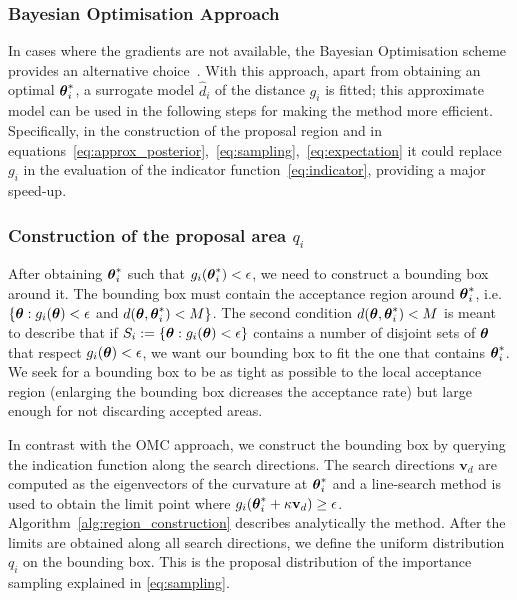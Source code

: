 \subsubsection*{Bayesian Optimisation Approach}
\label{subsubsec:GP_approach}

In cases where the gradients are not available, the Bayesian
Optimisation scheme provides an alternative
choice~\autocite{Shahriari2016}. With this approach, apart from
obtaining an optimal $\boldsymbol{\theta}_i^* $, a surrogate model $\hat{d}_i$ of
the distance $g_i$ is fitted; this approximate model can be used in
the following steps for making the method more
efficient. Specifically, in the construction of the proposal region
and in
equations~\eqref{eq:approx_posterior},~\eqref{eq:sampling},~\eqref{eq:expectation}
it could replace $g_i$ in the evaluation of the indicator
function~\ref{eq:indicator}, providing a major speed-up.

\subsubsection*{Construction of the proposal area $q_i$}

After obtaining $\boldsymbol{\theta}_i^*$ such that $g_i(\boldsymbol{\theta}_i^*) < \epsilon$,
we need to construct a bounding box around it. The bounding box must
contain the acceptance region around $\boldsymbol{\theta}_i^*$, i.e.\
$\{ \boldsymbol{\theta} : g_i(\boldsymbol{\theta}) < \epsilon$ and
$d(\boldsymbol{\theta}, \boldsymbol{\theta}_i^*) < M \}$. The second condition
$d(\boldsymbol{\theta}, \boldsymbol{\theta}_i^*) < M$ is meant to describe that if
$S_i := \{ \boldsymbol{\theta} : g_i(\boldsymbol{\theta}) < \epsilon \} $ contains a number of
disjoint sets of $\boldsymbol{\theta}$ that respect $g_i(\boldsymbol{\theta}) < \epsilon$, we
want our bounding box to fit the one that contains $\boldsymbol{\theta}_i^*$. We
seek for a bounding box to be as tight as possible to the local
acceptance region (enlarging the bounding box dicreases the acceptance
rate) but large enough for not discarding accepted areas.

In contrast with the OMC approach, we construct the bounding box by
querying the indication function along the search directions. The
search directions $\mathbf{v}_d$ are computed as the eigenvectors of
the curvature at $\boldsymbol{\theta}_i^*$ and a line-search method is used to
obtain the limit point where
$g_i(\boldsymbol{\theta}_i^* + \kappa \mathbf{v}_d) \geq
\epsilon$. Algorithm~\ref{alg:region_construction} describes
analytically the method. After the limits are obtained along all
search directions, we define the uniform distribution $q_i$ on the
bounding box. This is the proposal distribution of the importance
sampling explained in \eqref{eq:sampling}.
